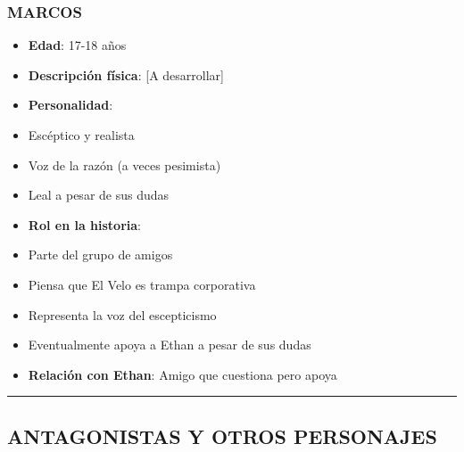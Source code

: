 \documentclass[11pt,a4paper]{report}
\begin{document}
\subsubsection{MARCOS}
\begin{itemize}
  \item \textbf{Edad}: 17-18 años
  \item \textbf{Descripción física}: [A desarrollar]
  \item \textbf{Personalidad}: 
  \item Escéptico y realista
  \item Voz de la razón (a veces pesimista)
  \item Leal a pesar de sus dudas
  \item \textbf{Rol en la historia}: 
  \item Parte del grupo de amigos
  \item Piensa que El Velo es trampa corporativa
  \item Representa la voz del escepticismo
  \item Eventualmente apoya a Ethan a pesar de sus dudas
  \item \textbf{Relación con Ethan}: Amigo que cuestiona pero apoya

\end{itemize}
\bigskip\hrule\bigskip

\subsection{ANTAGONISTAS Y OTROS PERSONAJES}
\end{document}
